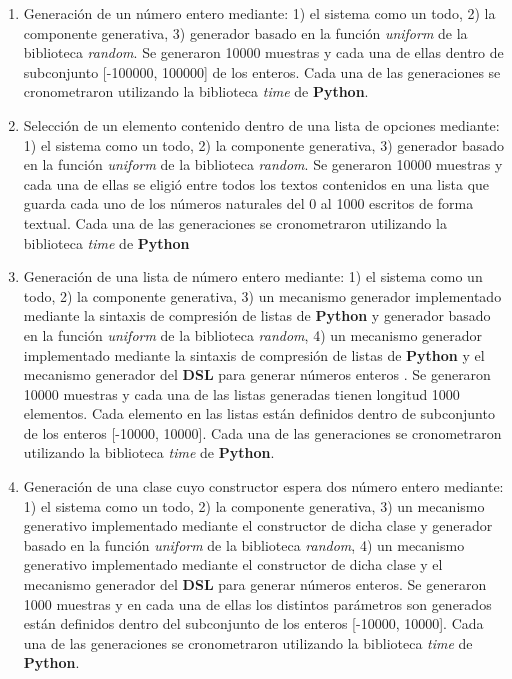 \begin{enumerate}
      \item Generación de un número entero mediante: 1) el sistema como un todo, 2) la componente generativa, 3) generador basado en la función {\it uniform} de la
            biblioteca {\it random}. Se generaron 10000 muestras y cada una de ellas dentro de subconjunto [-100000, 100000] de los enteros.
            Cada una de las generaciones se cronometraron utilizando la biblioteca {\it time} de {\bf Python}.
      \item Selección de un elemento contenido dentro de una lista de opciones mediante: 1) el sistema como un todo, 2) la componente generativa,
            3) generador basado en la función {\it uniform} de la biblioteca {\it random}. Se generaron 10000 muestras y cada una de ellas se eligió entre
            todos los textos contenidos en una lista que guarda cada uno de los números naturales del 0 al 1000 escritos de forma textual. Cada una de las
            generaciones se cronometraron utilizando la biblioteca {\it time} de {\bf Python}
      \item Generación de una lista de número entero mediante: 1) el sistema como un todo, 2) la componente generativa, 3) un mecanismo generador
            implementado mediante la sintaxis de compresión de listas de {\bf Python} y generador basado en la función {\it uniform} de la biblioteca {\it random},
            4) un mecanismo generador implementado mediante la sintaxis de compresión de listas de {\bf Python} y el mecanismo generador del
                  {\bf DSL} para generar números enteros . Se generaron 10000 muestras y cada una de las listas generadas tienen longitud 1000 elementos.
            Cada elemento en las listas están definidos dentro de subconjunto de los enteros [-10000, 10000]. Cada una de las generaciones se cronometraron utilizando la
            biblioteca {\it time} de {\bf Python}.
      \item Generación de una clase cuyo constructor espera dos número entero mediante: 1) el sistema como un todo, 2) la componente generativa,
            3) un mecanismo generativo implementado mediante el constructor de dicha clase y generador basado en la función {\it uniform} de la biblioteca {\it random}, 4) un
            mecanismo generativo implementado mediante el constructor de dicha clase y el mecanismo generador del {\bf DSL} para generar números enteros.
            Se generaron 1000 muestras y en cada una de ellas los distintos parámetros son generados están definidos dentro del subconjunto de los
            enteros [-10000, 10000]. Cada una de las generaciones se cronometraron utilizando la biblioteca {\it time} de {\bf Python}.
\end{enumerate}


